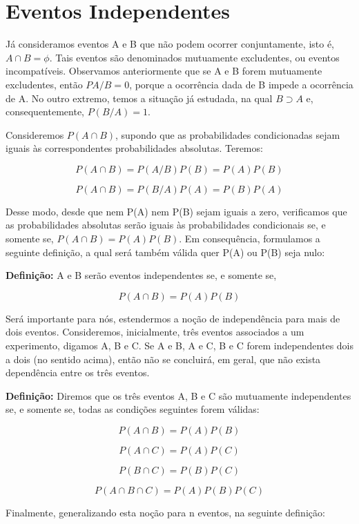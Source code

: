 \newpage
\section{Eventos Independentes}

Já consideramos eventos A e B que não podem ocorrer conjuntamente,
isto é, $A\cap B = \phi$. Tais eventos são denominados mutuamente
excludentes, ou eventos incompatíveis. Observamos anteriormente
que se A e B forem mutuamente excludentes, então $PA/B=0$, porque
a ocorrência dada de B impede a ocorrência de A. No outro extremo,
temos a situação já estudada, na qual $B \supset A$ e,
consequentemente, $P(B/A)=1$.\vskip0.3cm

Consideremos $P(A \cap B)$, supondo que as probabilidades
condicionadas sejam iguais às correspondentes probabilidades
absolutas. Teremos:

$$
P(A \cap B)= P(A/B)P(B)=P(A)P(B)
$$

$$
P(A \cap B)= P(B/A)P(A)=P(B)P(A)
$$


Desse modo, desde que nem P(A) nem P(B) sejam iguais a zero,
verificamos que as probabilidades absolutas serão iguais às
probabilidades condicionais se, e somente se, $P(A \cap
B)=P(A)P(B)$. Em consequência, formulamos a seguinte definição, a
qual será também válida quer P(A) ou P(B) seja nulo:\vskip0.3cm

\textbf{Definição:} A e B serão eventos independentes se, e
somente se,

$$
P(A \cap B) = P(A)P(B)
$$


Será importante para nós, estendermos a noção de independência
para mais de dois eventos. Consideremos, inicialmente, três
eventos associados a um experimento, digamos A, B e C. Se A e B, A
e C, B e C forem independentes dois a dois (no sentido acima),
então não se concluirá, em geral, que não exista dependência entre
os três eventos.\vskip0.3cm

\textbf{Definição:} Diremos que os três eventos A, B e C são
mutuamente independentes se, e somente se, todas as condições
seguintes forem válidas:

$$
P(A \cap B)=P(A)P(B)
$$

$$
P(A \cap C)=P(A)P(C)
$$

$$
P(B \cap C)=P(B)P(C)
$$

$$
P(A \cap B \cap C)=P(A)P(B)P(C)
$$


Finalmente, generalizando esta noção para n eventos, na seguinte
definição:\vskip0.3cm



